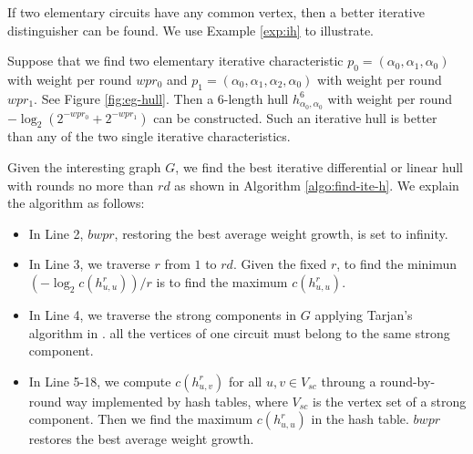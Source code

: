 If two elementary circuits have any common vertex, then a better iterative distinguisher can be found. We use Example \ref{exp:ih} to illustrate. 

\begin{example}\label{exp:ih}
    Suppose that we find two elementary iterative characteristic $p_0=(\alpha_0,\alpha_1,\alpha_0)$ with weight per round $wpr_0$ and $p_1=(\alpha_0,\alpha_1,\alpha_2,\alpha_0)$ with weight per round $wpr_1$. See Figure \ref{fig:eg-hull}. Then a 6-length hull $h_{\alpha_0,\alpha_0}^6$ with weight per round $-\log_2(2^{-wpr_0}+2^{-wpr_1})$ can be constructed. Such an iterative hull is better than any of the two single iterative characteristics. 
\end{example}



Given the interesting graph $G$, we find the best iterative differential or linear hull with rounds no more than $rd$ as shown in Algorithm \ref{algo:find-ite-h}. We explain the algorithm as follows: 





\begin{itemize}
    \item In Line 2, $bwpr$, restoring the best average weight growth, is set to infinity. 
    \item In Line 3, we traverse $r$ from $1$ to $rd$. Given the fixed $r$, to find the minimun $(-\log_2c(h^r_{u,u}))/r$ is to find the maximum $c(h^r_{u,u})$.
    \item In Line 4, we traverse the strong components in $G$ applying Tarjan's algorithm in \cite{tarjan1972depth}. all the vertices of one circuit must belong to the same strong component. 
    \item In Line 5-18, we compute $c(h^r_{u,v})$ for all $u,v\in V_{sc}$ throung a round-by-round way implemented by hash tables, where $V_{sc}$ is the vertex set of a strong component. Then we find the maximum $c(h^r_{u,u})$ in the hash table. $bwpr$ restores the best average weight growth.
\end{itemize}


